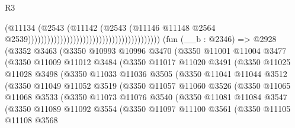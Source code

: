 \begin{lexlean}{R3}
\begin{coremodule}
                                                                            (@11134
                                                                              (@2543
                                                                                (@11142
                                                                                  (@2543
                                                                                    (@11146
                                                                                      @11148
                                                                                      @2564
                                                                                      @2539)))))))))))))))))))))))))))))))))))))))))
    (fun (__b : @2346) =>
    @2928
      (@3352
        @3463
        (@3350
          @10993
          @10996
          @3470
          (@3350
            @11001
            @11004
            @3477
            (@3350
              @11009
              @11012
              @3484
              (@3350
                @11017
                @11020
                @3491
                (@3350
                  @11025
                  @11028
                  @3498
                  (@3350
                    @11033
                    @11036
                    @3505
                    (@3350
                      @11041
                      @11044
                      @3512
                      (@3350
                        @11049
                        @11052
                        @3519
                        (@3350
                          @11057
                          @11060
                          @3526
                          (@3350
                            @11065
                            @11068
                            @3533
                            (@3350
                              @11073
                              @11076
                              @3540
                              (@3350
                                @11081
                                @11084
                                @3547
                                (@3350
                                  @11089
                                  @11092
                                  @3554
                                  (@3350
                                    @11097
                                    @11100
                                    @3561
                                    (@3350
                                      @11105
                                      @11108
                                      @3568

\end{coremodule}
\end{lexlean}
